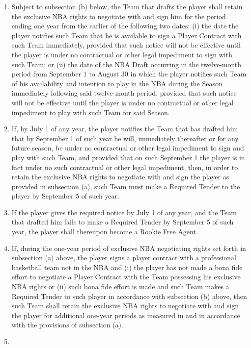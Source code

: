 \documentclass[
]{book}
\providecommand{\tightlist}{%
  \setlength{\itemsep}{0pt}\setlength{\parskip}{0pt}}
\begin{document}
\begin{enumerate}
\def\labelenumi{(\alph{enumi})}
\tightlist
\item
  Subject to subsection (b) below, the Team that drafts the player shall retain the exclusive NBA rights to negotiate with and sign him for the period ending one year from the earlier of the following two dates: (i) the date the player notifies such Team that he is available to sign a Player Contract with such Team immediately, provided that such notice will not be effective until the player is under no contractual or other legal impediment to sign with such Team; or (ii) the date of the NBA Draft occurring in the twelve-month period from September 1 to August 30 in which the player notifies such Team of his availability and intention to play in the NBA during the Season immediately following said twelve-month period, provided that such notice will not be effective until the player is under no contractual or other legal impediment to play with such Team for said Season.
\item
  If, by July 1 of any year, the player notifies the Team that has drafted him that by September 1 of such year he will, immediately thereafter or for any future season, be under no contractual or other legal impediment to sign and play with such Team, and provided that on such September 1 the player is in fact under no such contractual or other legal impediment, then, in order to retain the exclusive NBA rights to negotiate with and sign the player as provided in subsection (a), such Team must make a Required Tender to the player by September 5 of such year.
\item
  If the player gives the required notice by July 1 of any year, and the Team that drafted him fails to make a Required Tender by September 5 of such year, the player shall thereupon become a Rookie Free Agent.
\item
  If, during the one-year period of exclusive NBA negotiating rights set forth in subsection (a) above, the player signs a player contract with a professional basketball team not in the NBA and (i) the player has not made a bona fide effort to negotiate a Player Contract with the Team possessing his exclusive NBA rights or (ii) such bona fide effort is made and such Team makes a Required Tender to such player in accordance with subsection (b) above, then such Team shall retain the exclusive NBA rights to negotiate with and sign the player for additional one-year periods as measured in and in accordance with the provisions of subsection (a).
\item

\end{enumerate}
\end{document}
